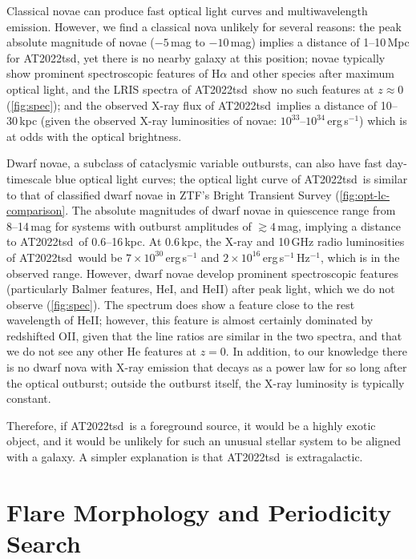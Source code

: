 \documentclass{nature_plusfigure}
\newcommand{\at}{AT2022tsd}
\begin{document}
\begin{methods}
Classical novae can produce fast optical light curves and multiwavelength emission\cite{Chomiuk2021}. However, we find a classical nova unlikely for several reasons: the peak absolute magnitude of novae ($-5\,$mag to $-10\,$mag\cite{Chomiuk2021}) implies a distance of 1--10\,Mpc for \at, yet there is no nearby galaxy at this position; novae typically show prominent spectroscopic features of H$\alpha$ and other species after maximum optical light\cite{Chomiuk2021}, and the LRIS spectra of \at\ show no such features at $z\approx0$ (\ref{fig:spec}); and the observed X-ray flux of \at\ implies a distance of 10--30\,kpc (given the observed X-ray luminosities\cite{Chomiuk2021} of novae: $10^{33}$--$10^{34}\,$erg\,s$^{-1}$) which is at odds with the optical brightness.

Dwarf novae, a subclass of cataclysmic variable outbursts, can also have fast day-timescale blue optical light curves; the optical light curve of \at\ is similar to that of classified dwarf novae in ZTF's Bright Transient Survey\cite{PerleyBTS} (\ref{fig:opt-lc-comparison}. The absolute magnitudes of dwarf novae in quiescence range from 8--14\,mag for systems with outburst amplitudes of $\gtrsim4\,$mag, implying a distance to \at\ of 0.6--16\,kpc. At 0.6\,kpc, the X-ray and 10\,GHz radio luminosities of \at\ would be $7\times10^{30}\,$erg\,s$^{-1}$ and $2\times10^{16}$\,erg\,s$^{-1}$\,Hz$^{-1}$, which is in the observed range\cite{Polzin2022,Coppejans2020_CV}. 
However, dwarf novae develop prominent spectroscopic features (particularly Balmer features, HeI, and HeII) after peak light\cite{Morales-Rueda2002,Han2020}, which we do not observe (\ref{fig:spec}). The spectrum does show a feature close to the rest wavelength of HeII; however, this feature is almost certainly dominated by redshifted OII, given that the line ratios are similar in the two spectra, and that we do not see any other He features at $z=0$.
In addition, to our knowledge there is no dwarf nova with X-ray emission that decays as a power law for so long after the optical outburst; outside the outburst itself, the X-ray luminosity is typically constant\cite{Fertig2011}.

Therefore, if \at\ is a foreground source, it would be a highly exotic object, and it would be unlikely for such an unusual stellar system to be aligned with a galaxy. A simpler explanation is that \at\ is extragalactic.

\section{Flare Morphology and Periodicity Search}
\label{sec:flare-morphology}


\end{methods}
\end{document}
